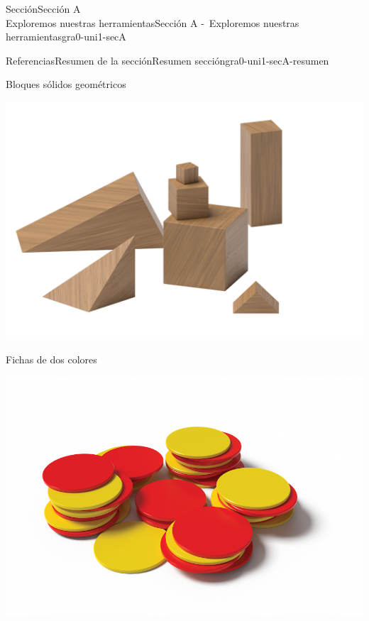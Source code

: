 \begin{sectionptx}{Sección}{{\Large Sección A\\}Exploremos nuestras herramientas}{}{Sección A -~Exploremos nuestras herramientas}{}{}{gra0-uni1-secA}
\begin{references-subsection}{Referencias}{Resumen de la sección}{}{Resumen sección}{}{}{gra0-uni1-secA-resumen}
\begin{sidebyside}{2}{0.05}{0.05}{0.1}
\begin{sbspanel}{0.4}
\end{sbspanel}%
\end{sidebyside}%
\begin{sidebyside}{2}{0.05}{0.05}{0.1}%
\begin{sbspanel}{0.4}%
Bloques sólidos geométricos%
\par
\includegraphics[max width=\linewidth, center]{external/png-source/K.1.A Beta Student Workbook.Geoblocks.png}
\end{sbspanel}%
\begin{sbspanel}{0.4}%
Fichas de dos colores%
\par
\includegraphics[max width=\linewidth, center]{external/png-source/K.1.A Beta Student Workbook.RedYellowChips_withShadow.png}
\end{sbspanel}%
\end{sidebyside}%
\begin{sidebyside}{2}{0.05}{0.05}{0.1}%

\end{sidebyside}
\end{references-subsection}
\end{sectionptx}
